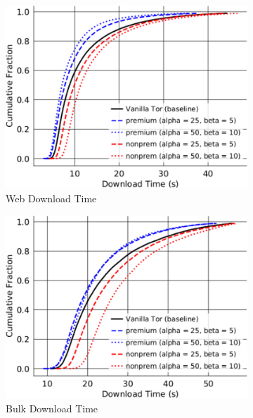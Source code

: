 \begin{figure} \centering
  \begin{subfigure}[t]{0.32\textwidth} \centering
    \includegraphics[trim={0 0cm 0 0cm},
      clip,width=1.0\textwidth]{images/modifier_pr25_web_lowloss.pdf}
    \caption{Web Download Time}
    \label{fig:modifier_pr25_web}
  \end{subfigure}
  \begin{subfigure}[t]{0.32\textwidth} \centering
    \includegraphics[trim={0 0cm 0 0cm}, clip,
      width=1.0\textwidth]{images/modifier_pr25_bulk_lowloss.pdf}
    \caption{Bulk Download Time}
    \label{fig:modifier_pr25_bulk}
  \end{subfigure}
  \begin{subfigure}[t]{0.32\textwidth} \centering

\end{subfigure}
\end{figure}
